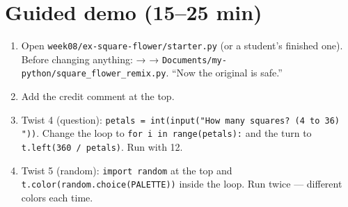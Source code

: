 \section{Guided demo (15--25 min)}
\begin{workedexample}
\begin{enumerate}[leftmargin=1.4em,itemsep=1pt]
  \item Open \texttt{week08/ex-square-flower/starter.py} (or a student's finished one). Before changing anything:  →  → \texttt{Documents/my-python/square\_flower\_remix.py}. \enquote{Now the original is safe.}
  \item Add the credit comment at the top.
  \item Twist 4 (question): \texttt{petals = int(input("How many squares? (4 to 36) "))}. Change the loop to \texttt{for i in range(petals):} and the turn to \texttt{t.left(360 / petals)}. Run with 12.
  \item Twist 5 (random): \texttt{import random} at the top and \texttt{t.color(random.choice(PALETTE))} inside the loop. Run twice --- different colors each time.
\end{enumerate}
\end{workedexample}


